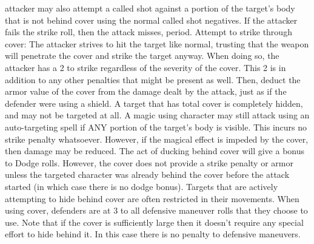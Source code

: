 \documentclass[twoside]{book}
\begin{document}
               attacker may also attempt a called shot against a portion
               of the target's body that is not behind cover using
               the normal called shot negatives. If the attacker fails
               the strike roll, then the attack misses, period.   Attempt to strike through cover: The attacker
               strives to hit the target like normal, trusting that the
               weapon will penetrate the cover and strike the target
               anyway. When doing so, the attacker has a 2 to
               strike regardless of the severity of the cover. This
               2 is in addition to any other penalties that might
               be present as well. Then, deduct the armor value of the
               cover from the damage dealt by the attack, just as if the
               defender were using a shield.   A target that has total cover is completely hidden,
               and may not be targeted at all.   A magic using character may still attack using an
               auto-targeting spell if ANY portion of the target's
               body is visible. This incurs no strike penalty whatsoever.
               However, if the magical effect is impeded by the cover,
               then damage may be reduced.   The act of ducking behind cover will give a bonus
               to Dodge rolls. However, the cover does not provide a
               strike penalty or armor unless the targeted character was
               already behind the cover before the attack started (in
               which case there is no dodge bonus).   Targets that are actively attempting to hide behind
               cover are often restricted in their movements. When using
               cover, defenders are at 3 to all defensive maneuver
               rolls that they choose to use. Note that if the cover is
               sufficiently large then it doesn't require any
               special effort to hide behind it. In this case there is no
               penalty to defensive maneuvers. 
  

  
\end{document}

